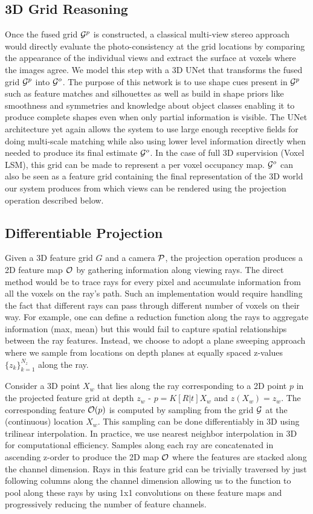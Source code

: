 \documentclass[../thesis.tex]{subfiles}
\begin{document}
\subsection{3D Grid Reasoning}
Once the fused grid $\mathcal{G}^p$ is constructed, a classical multi-view stereo approach would directly evaluate the photo-consistency at the grid locations by comparing the appearance of the individual views and extract the surface at voxels where the images agree. We model this step with a 3D UNet that transforms the fused grid $\mathcal{G}^p$ into $\mathcal{G}^o$. The purpose of this network is to use shape cues present in $\mathcal{G}^p$ such as feature matches and silhouettes as well as build in shape priors like smoothness and symmetries and knowledge about object classes enabling it to produce complete shapes even when only partial information is visible. The UNet architecture yet again allows the system to use large enough receptive fields for doing multi-scale matching while also using lower level information directly when needed to produce its final estimate $\mathcal{G}^o$. In the case of full 3D supervision (Voxel LSM), this grid can be made to represent a per voxel occupancy map. $\mathcal{G}^o$ can also be seen as a feature grid containing the final representation of the 3D world our system produces from which views can be rendered using the projection operation described below.


\subsection{Differentiable Projection}
Given a 3D feature grid $G$ and a camera $\mathcal{P}$, the projection operation produces a 2D feature map $\mathcal{O}$ by gathering information along viewing rays. The direct method would be to trace rays for every pixel and accumulate information from all the voxels on the ray's path. Such an implementation would require handling the fact that different rays can pass through different number of voxels on their way. For example, one can define a reduction function along the rays to aggregate information (\eg max, mean) but this would fail to capture spatial relationships between the ray features. Instead, we choose to adopt a plane sweeping approach where we sample from locations on depth planes at equally spaced z-values $\{z_k\}_{k=1}^{N_z}$ along the ray.

Consider a 3D point $X_w$ that lies along the ray corresponding to a 2D point $p$ in the projected feature grid at depth $z_w$ - \ie $p=K[R|t]X_{w}$ and $z(X_w)=z_w$. The corresponding feature $\mathcal{O}(p)$ is computed by sampling from the grid $\mathcal{G}$ at the (continuous) location $X_w$. This sampling can be done differentiably in 3D using trilinear interpolation. In practice, we use nearest neighbor interpolation in 3D for computational efficiency. Samples along each ray are concatenated in ascending z-order to produce the 2D map $\mathcal{O}$ where the features are stacked along the channel dimension. Rays in this feature grid can be trivially traversed by just following columns along the channel dimension allowing us to  the function to pool along these rays by using 1x1 convolutions on these feature maps and progressively reducing the number of feature channels.
\end{document}
